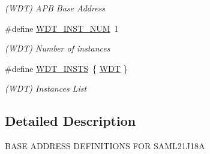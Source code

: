 \begin{DoxyCompactItemize}
\begin{DoxyCompactList}\small\item\em (W\+D\+T) A\+P\+B Base Address \end{DoxyCompactList}\item 
\hypertarget{group___s_a_m_l21_j18_a__base_gafac1297a6a4da34e5ff29b61dfb5552e}{}\#define \hyperlink{group___s_a_m_l21_j18_a__base_gafac1297a6a4da34e5ff29b61dfb5552e}{W\+D\+T\+\_\+\+I\+N\+S\+T\+\_\+\+N\+U\+M}~1\label{group___s_a_m_l21_j18_a__base_gafac1297a6a4da34e5ff29b61dfb5552e}

\begin{DoxyCompactList}\small\item\em (W\+D\+T) Number of instances \end{DoxyCompactList}\item 
\hypertarget{group___s_a_m_l21_j18_a__base_gacde2ac91a26c9c096b18f47009b48b81}{}\#define \hyperlink{group___s_a_m_l21_j18_a__base_gacde2ac91a26c9c096b18f47009b48b81}{W\+D\+T\+\_\+\+I\+N\+S\+T\+S}~\{ \hyperlink{group___s_a_m_l21_j18_a__base_ga9646f603341e1ee220bf5d9948f05cb0}{W\+D\+T} \}\label{group___s_a_m_l21_j18_a__base_gacde2ac91a26c9c096b18f47009b48b81}

\begin{DoxyCompactList}\small\item\em (W\+D\+T) Instances List \end{DoxyCompactList}\end{DoxyCompactItemize}


\subsection{Detailed Description}
B\+A\+S\+E A\+D\+D\+R\+E\+S\+S D\+E\+F\+I\+N\+I\+T\+I\+O\+N\+S F\+O\+R S\+A\+M\+L21\+J18\+A 